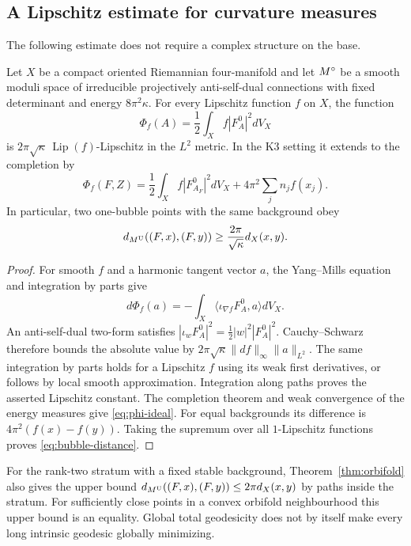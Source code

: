 \subsection{A Lipschitz estimate for curvature measures}
The following estimate does not require a complex structure on the base.

\begin{proposition}\label{prop:lipschitz}
Let $X$ be a compact oriented Riemannian four-manifold and let $M^{\circ}$ be a
smooth moduli space of irreducible projectively anti-self-dual connections
with fixed determinant and energy $8\pi^2\kappa$. For every Lipschitz
function $f$ on $X$, the function
\[
 \Phi_f(A)=\frac12\int_X f|F_A^0|^2dV_X
\]
is $2\pi\sqrt\kappa\,\operatorname{Lip}(f)$-Lipschitz in the $L^2$ metric.
In the K3 setting it extends to the completion by
\begin{equation}\label{eq:phi-ideal}
 \Phi_f(F,Z)=\frac12\int_Xf|F_{A_F}^0|^2dV_X
                   +4\pi^2\sum_jn_jf(x_j).
\end{equation}
In particular, two one-bubble points with the same background obey
\begin{equation}\label{eq:bubble-distance}
 d_{M^{\mathrm U}}((F,x),(F,y))\ge\frac{2\pi}{\sqrt\kappa}d_X(x,y).
\end{equation}
\end{proposition}
\begin{proof}
For smooth $f$ and a harmonic tangent vector $a$, the Yang--Mills equation
and integration by parts give
\[
 d\Phi_f(a)=-\int_X\langle\iota_{\nabla f}F_A^0,a\rangle dV_X.
\]
An anti-self-dual two-form satisfies
$|\iota_wF_A^0|^2=\tfrac12|w|^2|F_A^0|^2$.
Cauchy--Schwarz therefore bounds the absolute value by
$2\pi\sqrt\kappa\|df\|_\infty\|a\|_{L^2}$.
The same integration by parts holds for a Lipschitz $f$ using its weak
first derivatives, or follows by local smooth approximation. Integration
along paths proves the asserted Lipschitz constant.
The completion theorem and weak convergence of the energy measures give
\eqref{eq:phi-ideal}. For equal backgrounds its difference is
$4\pi^2(f(x)-f(y))$. Taking the supremum over all $1$-Lipschitz functions
proves \eqref{eq:bubble-distance}.
\end{proof}

For the rank-two stratum with a fixed stable background,
Theorem~\ref{thm:orbifold} also gives the upper bound
$d_{M^{\mathrm U}}((F,x),(F,y))\le2\pi d_X(x,y)$ by paths inside the stratum.
For sufficiently close points in a convex orbifold neighbourhood this
upper bound is an equality. Global total geodesicity does not by itself
make every long intrinsic geodesic globally minimizing.
